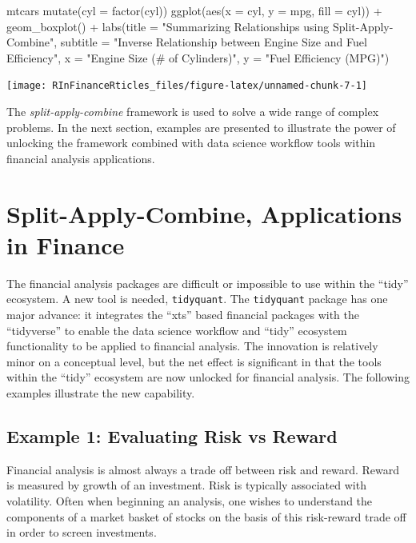\begin{Schunk}
\begin{Sinput}
mtcars %
    mutate(cyl = factor(cyl)) %
    ggplot(aes(x = cyl, y = mpg, fill = cyl)) +
    geom_boxplot() +
    labs(title = "Summarizing Relationships using Split-Apply-Combine",
         subtitle = "Inverse Relationship between Engine Size and Fuel Efficiency",
         x = "Engine Size (# of Cylinders)",
         y = "Fuel Efficiency (MPG)")
\end{Sinput}


\begin{center}\texttt{[image: RInFinanceRticles\_files/figure-latex/unnamed-chunk-7-1]} \end{center}

\end{Schunk}

The \emph{split-apply-combine} framework is used to solve a wide range
of complex problems. In the next section, examples are presented to
illustrate the power of unlocking the framework combined with data
science workflow tools within financial analysis applications.

\section{Split-Apply-Combine, Applications in
Finance}\label{split-apply-combine-applications-in-finance}

The financial analysis packages are difficult or impossible to use
within the ``tidy'' ecosystem. A new tool is needed, \texttt{tidyquant}.
The \texttt{tidyquant} package has one major advance: it integrates the
``xts'' based financial packages with the ``tidyverse'' to enable the
data science workflow and ``tidy'' ecosystem functionality to be applied
to financial analysis. The innovation is relatively minor on a
conceptual level, but the net effect is significant in that the tools
within the ``tidy'' ecosystem are now unlocked for financial analysis.
The following examples illustrate the new capability.

\subsection{Example 1: Evaluating Risk vs
Reward}\label{example-1-evaluating-risk-vs-reward}

Financial analysis is almost always a trade off between risk and reward.
Reward is measured by growth of an investment. Risk is typically
associated with volatility. Often when beginning an analysis, one wishes
to understand the components of a market basket of stocks on the basis
of this risk-reward trade off in order to screen investments.

